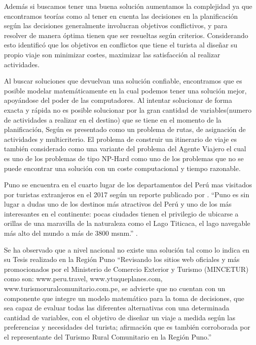 Además si buscamos tener una buena solución aumentamos la complejidad ya que encontramos teorías como al tener en cuenta las decisiones en la planificación según \cite{Ehrgott2005MulticriteriaOptimization} las decisiones generalmente involucran objetivos conflictivos, y para resolver de manera óptima tienen que ser resueltas según criterios. Considerando esto \cite{RodriguezDiaz2012SistemaPersonalizado} identificó que los objetivos en conflictos que tiene el turista al diseñar su propio viaje son minimizar costes, maximizar las satisfacción al realizar actividades. 

Al buscar soluciones que devuelvan una solución confiable, encontramos que es posible modelar matemáticamente en la cual podemos tener una solución mejor, apoyándose del poder de las computadores. Al intentar solucionar de forma exacta y rápida no es posible solucionar por la gran cantidad de variables(numero de actividades a realizar en el destino) que se tiene en el momento de la planificación, Según  es presentado como un problema de rutas, de asignación de actividades y multicriterio. El problema de construir un itinerario de viaje es también considerado como una variante del problema del Agente Viajero el cual es uno de los problemas de tipo NP-Hard como uno de los problemas que no se puede encontrar una solución con un coste computacional y tiempo razonable. 

Puno se encuentra en el cuarto lugar de los departamentos del Perú mas visitados por turistas extranjeros en el 2017 según un reporte publicado por .  “Puno es sin lugar a dudas uno de los destinos más atractivos del Perú y uno de los más interesantes en el continente: pocas ciudades tienen el privilegio de ubicarse a orillas de una maravilla de la naturaleza como el Lago Titicaca, el lago navegable más alto del mundo a más de 3800 msnm.”  \cite{TurismoPuno}.

Se ha observado que a nivel nacional no existe una solución tal como lo indica  en su Tesis realizado en la Región Puno “Revisando los sitios web oficiales y más promocionados por el Ministerio de Comercio Exterior y Turismo (MINCETUR) como son: www.peru.travel, www.ytuqueplanes.com, www.turismoruralcomunitario.com.pe, se advierte que no cuentan con un componente que integre un modelo matemático para la toma de decisiones, que sea capaz de evaluar todas las diferentes alternativas con una determinada cantidad de variables, con el objetivo de diseñar un viaje a medida según las preferencias y necesidades del turista; afirmación que es también corroborada por el representante del Turismo Rural Comunitario en la Región Puno.” 

